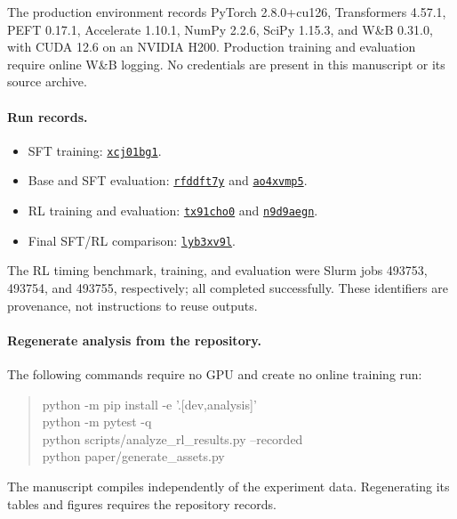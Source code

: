 The production environment records PyTorch 2.8.0+cu126, Transformers
4.57.1, PEFT 0.17.1, Accelerate 1.10.1, NumPy 2.2.6, SciPy 1.15.3,
and W\&B 0.31.0, with CUDA 12.6 on an NVIDIA H200. Production training
and evaluation require online W\&B logging. No credentials are present
in this manuscript or its source archive.

\paragraph{Run records.}
\begin{itemize}
\item SFT training:
\href{https://forge.coreweave.com/wandb/yash2007-university-of-washington/stochastic-llm/runs/xcj01bg1}{\texttt{xcj01bg1}}.
\item Base and SFT evaluation:
\href{https://forge.coreweave.com/wandb/yash2007-university-of-washington/stochastic-llm/runs/rfddft7y}{\texttt{rfddft7y}} and
\href{https://forge.coreweave.com/wandb/yash2007-university-of-washington/stochastic-llm/runs/ao4xvmp5}{\texttt{ao4xvmp5}}.
\item RL training and evaluation:
\href{https://forge.coreweave.com/wandb/yash2007-university-of-washington/stochastic-llm/runs/tx91cho0}{\texttt{tx91cho0}} and
\href{https://forge.coreweave.com/wandb/yash2007-university-of-washington/stochastic-llm/runs/n9d9aegn}{\texttt{n9d9aegn}}.
\item Final SFT/RL comparison:
\href{https://forge.coreweave.com/wandb/yash2007-university-of-washington/stochastic-llm/runs/lyb3xv9l}{\texttt{lyb3xv9l}}.
\end{itemize}
The RL timing benchmark, training, and evaluation were Slurm jobs
493753, 493754, and 493755, respectively; all completed successfully.
These identifiers are provenance, not instructions to reuse outputs.

\paragraph{Regenerate analysis from the repository.}
The following commands require no GPU and create no online training run:
\begin{quote}\small\ttfamily
python -m pip install -e '.[dev,analysis]'\\
python -m pytest -q\\
python scripts/analyze\_rl\_results.py --recorded\\
python paper/generate\_assets.py
\end{quote}
The manuscript compiles independently of the experiment data. Regenerating
its tables and figures requires the repository records.
